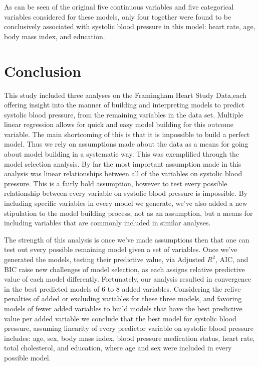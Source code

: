 \documentclass{article}\usepackage[]{graphicx}\usepackage[]{color}
\begin{document}
As can be seen of the original five continuous variables and five categorical variables considered for these models, only four together were found to be conclusively associated with systolic blood pressure in this model:  heart rate, age, body mass index, and education.  


\section{Conclusion}

This study included three analyses on the Framingham Heart Study Data,each offering insight into the manner of building and interpreting models to predict systolic blood pressure, from the remaining variables in the data set.  Multiple linear regression allows for quick and easy model building for this outcome variable.  The main shortcoming of this is that it is impossible to build a perfect model. Thus we rely on assumptions made about the data as a means for going about model building in a systematic way.  This was exemplified through the model selection analysis. By far the most important assumption made in this analysis was linear relationships between all of the variables on systolic blood pressure.  This is a fairly bold assumption, however to test every possible relationship between every variable on systolic blood pressure is impossible. By including specific variables in every model we generate, we've also added a new stipulation to the model building process, not as an assumption, but a means for including variables that are commonly included in similar analyses.  

The strength of this analysis is once we've made assumptions then that one can test out every possible remaining model given a set of variables.  Once we've generated the models, testing their predictive value, via Adjusted $R^2$, AIC, and BIC raise new challenges of model selection, as each assigns relative predictive value of each model differently.  Fortunately, our analysis resulted in convergence in the best predicted models of 6 to 8 added variables. Considering the relive penalties of added or excluding variables for these three models, and favoring models of fewer added variables to build models that have the best predictive value per added variable we conclude that the best model for systolic blood pressure, assuming linearity of every predictor variable on systolic blood pressure includes: age, sex, body mass index, blood pressure medication status, heart rate, total cholesterol, and education, where age and sex were included in every possible model.
\end{document}
